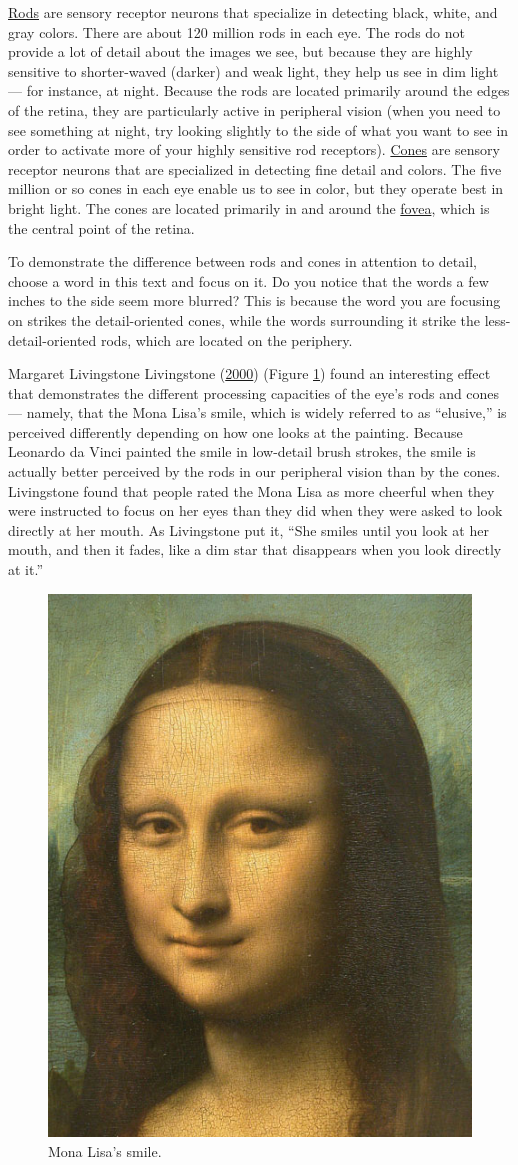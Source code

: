 \documentclass[
]{krantz}
\begin{document}
\protect\hyperlink{rods}{Rods} are sensory receptor neurons that specialize in detecting black, white, and gray colors. There are about 120 million rods in each eye. The rods do not provide a lot of detail about the images we see, but because they are highly sensitive to shorter-waved (darker) and weak light, they help us see in dim light --- for instance, at night. Because the rods are located primarily around the edges of the retina, they are particularly active in peripheral vision (when you need to see something at night, try looking slightly to the side of what you want to see in order to activate more of your highly sensitive rod receptors). \protect\hyperlink{cones}{Cones} are sensory receptor neurons that are specialized in detecting fine detail and colors. The five million or so cones in each eye enable us to see in color, but they operate best in bright light. The cones are located primarily in and around the \protect\hyperlink{fovea}{fovea}, which is the central point of the retina.

To demonstrate the difference between rods and cones in attention to detail, choose a word in this text and focus on it. Do you notice that the words a few inches to the side seem more blurred? This is because the word you are focusing on strikes the detail-oriented cones, while the words surrounding it strike the less-detail-oriented rods, which are located on the periphery.

Margaret Livingstone Livingstone (\protect\hyperlink{ref-livingstone2000warm}{2000}) (Figure \ref{fig:monalisa}) found an interesting effect that demonstrates the different processing capacities of the eye's rods and cones --- namely, that the Mona Lisa's smile, which is widely referred to as ``elusive,'' is perceived differently depending on how one looks at the painting. Because Leonardo da Vinci painted the smile in low-detail brush strokes, the smile is actually better perceived by the rods in our peripheral vision than by the cones. Livingstone found that people rated the Mona Lisa as more cheerful when they were instructed to focus on her eyes than they did when they were asked to look directly at her mouth. As Livingstone put it, ``She smiles until you look at her mouth, and then it fades, like a dim star that disappears when you look directly at it.''

\begin{figure}

{\centering \includegraphics[width=0.3\linewidth]{images/ch2/fig2} 

}

\caption{Mona Lisa's smile.}\label{fig:monalisa}
\end{figure}
\end{document}
